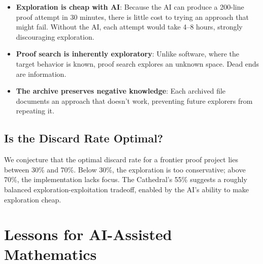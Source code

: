 \documentclass[11pt,a4paper]{article}
\begin{document}
\begin{itemize}
  \item \textbf{Exploration is cheap with AI}: Because the AI can
    produce a 200-line proof attempt in 30 minutes, there is little
    cost to trying an approach that might fail. Without the AI, each
    attempt would take 4--8 hours, strongly discouraging exploration.
  \item \textbf{Proof search is inherently exploratory}: Unlike
    software, where the target behavior is known, proof search
    explores an unknown space. Dead ends are information.
  \item \textbf{The archive preserves negative knowledge}: Each
    archived file documents an approach that doesn't work, preventing
    future explorers from repeating it.
\end{itemize}

\subsection{Is the Discard Rate Optimal?}

We conjecture that the optimal discard rate for a frontier proof
project lies between 30\% and 70\%. Below 30\%, the exploration is
too conservative; above 70\%, the implementation lacks focus. The
Cathedral's 55\% suggests a roughly balanced exploration-exploitation
tradeoff, enabled by the AI's ability to make exploration cheap.

\section{Lessons for AI-Assisted Mathematics}
\label{sec:lessons}
\end{document}
